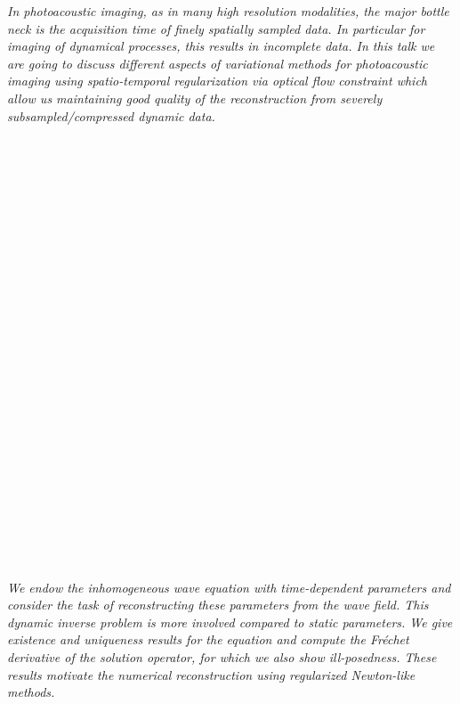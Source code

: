   \begin{multicols}{2}
      \textit{In photoacoustic imaging, as in many high resolution modalities, the major bottle neck is the acquisition time of finely spatially sampled data. In particular for imaging of dynamical processes, this results in incomplete data. In this talk we are going to discuss different aspects of variational methods for photoacoustic imaging using spatio-temporal regularization via optical flow constraint which allow us maintaining good quality of the reconstruction from severely subsampled/compressed dynamic data.}\\
\\ 
        \\
        \\\\
        \\
        \\\\
        \\
        \\\\
        \\
        \\\\
        \\
        \\\\
        \\
        \\\\
        \\
        \\\\
        \\
        \\\\
\\
      \textit{We endow the inhomogeneous wave equation with time-dependent parameters and consider the task of reconstructing these parameters from the wave field. This dynamic inverse problem is more involved compared to static parameters. We give existence and uniqueness results for the equation and compute the Fréchet derivative of the solution operator, for which we also show ill-posedness. These results motivate the numerical reconstruction using regularized Newton-like methods.}\\

\end{multicols}
